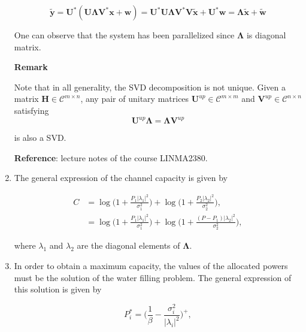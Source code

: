 \documentclass [a4paper, 11pt] {article}
\begin{document}
\begin{solution}
\begin{enumerate}
        \begin{equation} \mathbf{\tilde{y}} = \mathbf{U}^*(\mathbf{U}\mathbf{\Lambda}\mathbf{V}^*\mathbf{x} + \mathbf{w} ) = \mathbf{U}^*\mathbf{U}\mathbf{\Lambda}\mathbf{V}^*\mathbf{V}\mathbf{\tilde{x}} + \mathbf{U}^*\mathbf{w} = \mathbf{\Lambda} \mathbf{\tilde{x}} + \mathbf{\tilde{w}}
        \end{equation}
        
        One can observe that the system has been parallelized since $\mathbf{\Lambda}$ is diagonal matrix. 
        

        \textbf{Remark}
        
        
        Note that in all generality, the SVD decomposition is not unique. Given a matrix $\mathbf{H} \in \mathcal{C}^{m \times n}$, any pair of unitary matrices $\mathbf{U}^{up} \in \mathcal{C}^{m \times m}$ and $\mathbf{V}^{up} \in \mathcal{C}^{n \times n}$ satisfying 
        \begin{equation}\mathbf{U}^{up}\mathbf{\Lambda}= \mathbf{\Lambda}\mathbf{V}^{up}\end{equation}
        
        is also a SVD. 
        
        \textbf{Reference}: lecture notes of the course LINMA2380.

        \item The general expression of the channel capacity is given by 
        
        \begin{align}
         C &= \log\bigg(1 + \frac{P_1|\lambda_1|^2}{\sigma_1^2}\bigg) + \log\bigg(1 + \frac{P_2|\lambda_2|^2}{\sigma_2^2}\bigg), \\
         &= \log\bigg(1 + \frac{P_1|\lambda_1|^2}{\sigma_1^2}\bigg) + \log\bigg(1 + \frac{(P-P_1)|\lambda_2|^2}{\sigma_2^2}\bigg),
        \end{align}
        
        where $\lambda_1$ and $\lambda_2$ are the diagonal elements of $\mathbf{\Lambda}$.
        
        \item In order to obtain a maximum capacity, the values of the allocated powers must be the solution of the water filling problem. The general expression of this solution is given by 
        
        \begin{equation}P_i^* = \bigg(\frac{1}{\beta}-\frac{\sigma_i^2}{|\lambda_i|^2}\bigg)^+,
        \end{equation} 
        

\end{enumerate}
\end{solution}
\end{document}
